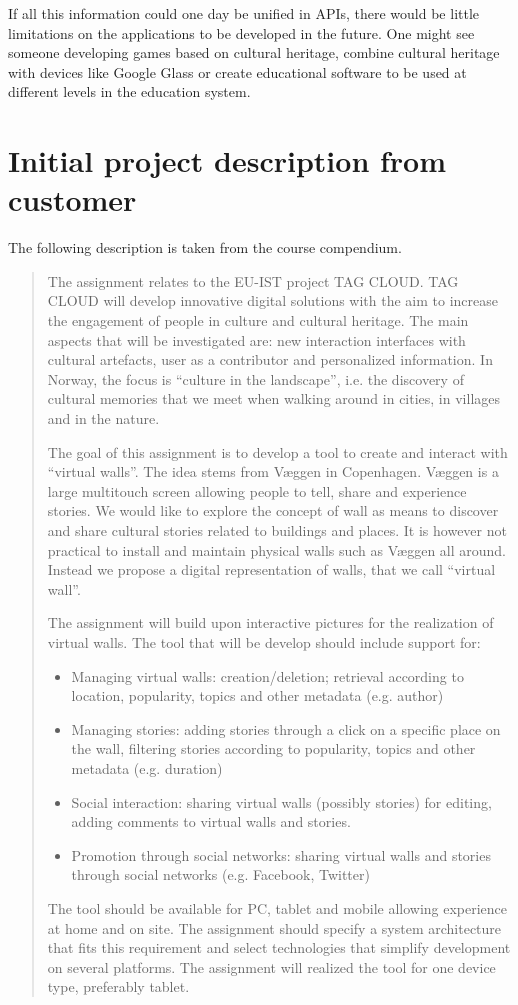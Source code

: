 \documentclass[11pt]{book}
\begin{document}
If all this information could one day be unified in APIs, there would be little limitations on the applications to be developed in the future. One might see someone developing games based on cultural heritage, combine cultural heritage with devices like Google Glass or create educational software to be used at different levels in the education system.



\appendix
\chapter{Initial project description from customer}
The following description is taken from the course compendium\cite[p. 47]{compendium}.

\begin{quotation}\noindent
The assignment relates to the EU-IST project TAG CLOUD. TAG CLOUD will develop innovative digital solutions with the aim to increase the engagement of people in culture and cultural heritage. The main aspects that will be investigated are: new interaction interfaces with cultural artefacts, user as a contributor and personalized information. In Norway, the focus is ``culture in the landscape'', i.e. the discovery of cultural memories that we meet when walking around in cities, in villages and in the nature.

The goal of this assignment is to develop a tool to create and interact with ``virtual walls''. The idea stems from Væggen in Copenhagen. Væggen is a large multitouch screen allowing people to tell, share and experience stories. We would like to explore the concept of wall as means to discover and share cultural stories related to buildings and places. It is however not practical to install and maintain physical walls such as Væggen all around. Instead we propose a digital representation of walls, that we call ``virtual wall''.

The assignment will build upon interactive pictures for the realization of virtual walls. The tool that will be develop should include support for:
\begin{itemize}
    \item Managing virtual walls: creation/deletion; retrieval according to location, popularity, topics and other metadata (e.g. author)
    \item Managing stories: adding stories through a click on a specific place on the wall, filtering stories
according to popularity, topics and other metadata (e.g. duration)
    \item Social interaction: sharing virtual walls (possibly stories) for editing, adding comments to virtual walls and stories.
    \item Promotion through social networks: sharing virtual walls and stories through social networks (e.g. Facebook, Twitter)
\end{itemize}
The tool should be available for PC, tablet and mobile allowing experience at home and on site. The assignment should specify a system architecture that fits this requirement and select technologies that simplify development on several platforms. The assignment will realized the tool for one device type, preferably tablet.


\end{quotation}
\end{document}
